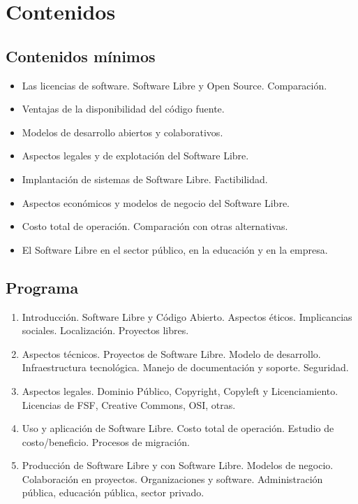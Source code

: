 \section {Contenidos}
\subsection{Contenidos mínimos}
\begin{itemize}
\item Las licencias de software. Software Libre y Open Source. Comparación. 
\item Ventajas de la disponibilidad del código fuente. 
\item Modelos de desarrollo abiertos y colaborativos. 
\item Aspectos legales y de explotación del Software Libre. 
\item Implantación de sistemas de Software Libre. Factibilidad. 
\item Aspectos económicos y modelos de negocio del Software Libre. 
\item Costo total de operación. Comparación con otras alternativas. 
\item El Software Libre en el sector público, en la educación y en la empresa.
\end{itemize}

\subsection {Programa}
\begin{enumerate}
	\item Introducción. Software Libre y Código Abierto. Aspectos éticos. Implicancias sociales. Localización. Proyectos libres.
	\item Aspectos técnicos. Proyectos de Software Libre. Modelo de desarrollo. Infraestructura tecnológica. Manejo de documentación y soporte. Seguridad. 
	\item Aspectos legales. Dominio Público, Copyright, Copyleft y Licenciamiento. Licencias de FSF, Creative Commons, OSI, otras. 
	\item Uso y aplicación de Software Libre. Costo total de operación. Estudio de costo/beneficio. Procesos de migración. 
	\item Producción de Software Libre y con Software Libre. Modelos de negocio. Colaboración en proyectos. Organizaciones y software.  Administración pública, educación pública, sector privado.
\end{enumerate}

